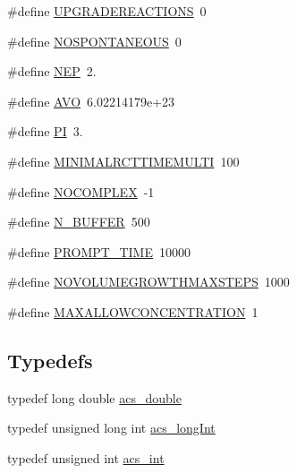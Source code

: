 \begin{DoxyCompactItemize}
\#define \hyperlink{a00066_a5119e853077046684673dad15af9199f}{U\-P\-G\-R\-A\-D\-E\-R\-E\-A\-C\-T\-I\-O\-N\-S}~0
\item 
\#define \hyperlink{a00066_a9ea25e0eb039e29accaed6cb99632deb}{N\-O\-S\-P\-O\-N\-T\-A\-N\-E\-O\-U\-S}~0
\item 
\#define \hyperlink{a00066_a029d801cdb598a397cb99ea968a64dc2}{N\-E\-P}~2.
\item 
\#define \hyperlink{a00066_a174754c04acfba9e1f66ba249e68643a}{A\-V\-O}~6.\-02214179e+23
\item 
\#define \hyperlink{a00066_a598a3330b3c21701223ee0ca14316eca}{P\-I}~3.
\item 
\#define \hyperlink{a00066_aa7d0d45ef785688de1c634290ceb02e7}{M\-I\-N\-I\-M\-A\-L\-R\-C\-T\-T\-I\-M\-E\-M\-U\-L\-T\-I}~100
\item 
\#define \hyperlink{a00066_a8da7044a9c837d5544508f9fa400ea52}{N\-O\-C\-O\-M\-P\-L\-E\-X}~-\/1
\item 
\#define \hyperlink{a00066_a2608b9496c2fae19afe620cc801c1967}{N\-\_\-\-B\-U\-F\-F\-E\-R}~500
\item 
\#define \hyperlink{a00066_a6e32fce4415266c0aecd671afba386d5}{P\-R\-O\-M\-P\-T\-\_\-\-T\-I\-M\-E}~10000
\item 
\#define \hyperlink{a00066_aaa9f3c25a2df117014005dabd9c43f77}{N\-O\-V\-O\-L\-U\-M\-E\-G\-R\-O\-W\-T\-H\-M\-A\-X\-S\-T\-E\-P\-S}~1000
\item 
\#define \hyperlink{a00066_a49e518711039e167e47bd51aed053390}{M\-A\-X\-A\-L\-L\-O\-W\-C\-O\-N\-C\-E\-N\-T\-R\-A\-T\-I\-O\-N}~1
\end{DoxyCompactItemize}
\subsection*{Typedefs}
\begin{DoxyCompactItemize}
\item 
typedef long double \hyperlink{a00066_ab776853a005fcbf56af0424a2a4dd607}{acs\-\_\-double}
\item 
typedef unsigned long int \hyperlink{a00066_a19319d75f02db4308bc5c0026d98cd85}{acs\-\_\-long\-Int}
\item 
typedef unsigned int \hyperlink{a00066_a8d277355641a098190360234e2ebde35}{acs\-\_\-int}
\end{DoxyCompactItemize}


